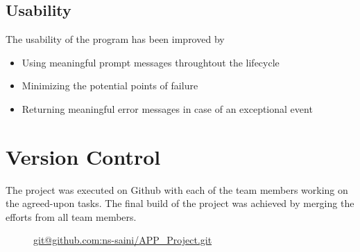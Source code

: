     \subsection{Usability}
    \begin{flushleft}
      The usability of the program has been improved by 
      \begin{itemize}
        \item {Using meaningful prompt messages throughtout the lifecycle }
        \item {Minimizing the potential points of failure }
        \item {Returning meaningful error messages in case of an exceptional event}
      \end{itemize}
    \end{flushleft}
  
  \section{Version Control}
    The project was executed on Github with each of the team members working on the agreed-upon tasks. The final build of the project was achieved by merging the efforts from all team members.
    
  \begin{figure}[h!]
    \centering
    \caption{\url{git@github.com:ns-saini/APP_Project.git}}
    \label{fig:Repository}
  \end{figure}

